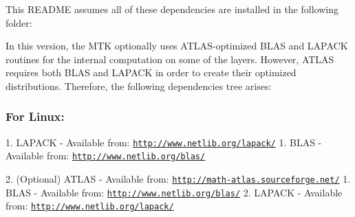 \begin{DoxyPre}\end{DoxyPre}



\begin{DoxyPre}This README assumes all of these dependencies are installed in the following
folder:\end{DoxyPre}



\begin{DoxyPre}
\end{DoxyPre}



\begin{DoxyPre}In this version, the MTK optionally uses ATLAS-optimized BLAS and LAPACK
routines for the internal computation on some of the layers. However, ATLAS
requires both BLAS and LAPACK in order to create their optimized distributions.
Therefore, the following dependencies tree arises:\end{DoxyPre}



\begin{DoxyPre}\subsubsection*{For Linux:}\end{DoxyPre}



\begin{DoxyPre}\end{DoxyPre}



\begin{DoxyPre}1. LAPACK - Available from: \href{http://www.netlib.org/lapack/}{\tt http://www.netlib.org/lapack/}
  1. BLAS - Available from: \href{http://www.netlib.org/blas/}{\tt http://www.netlib.org/blas/}\end{DoxyPre}



\begin{DoxyPre}2. (Optional) ATLAS - Available from: \href{http://math-atlas.sourceforge.net/}{\tt http://math-atlas.sourceforge.net/}
  1. BLAS - Available from: \href{http://www.netlib.org/blas/}{\tt http://www.netlib.org/blas/}
  2. LAPACK - Available from: \href{http://www.netlib.org/lapack/}{\tt http://www.netlib.org/lapack/}\end{DoxyPre}



